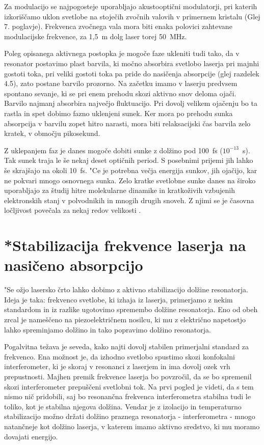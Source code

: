 Za modulacijo se najpogosteje uporabljajo akustooptični modulatorji, pri
katerih izkoriščamo uklon svetlobe na stoječih zvočnih valovih v
primernem kristalu (Glej 7. poglavje). Frekvenca zvočnega vala mora biti
enaka polovici zahtevane modulacijske frekvence, za 1,5~m dolg laser torej
50~MHz.

Poleg opisanega aktivnega postopka je mogoče faze ukleniti tudi tako, da v
resonator postavimo plast barvila, ki močno absorbira svetlobo laserja pri
majnhi gostoti toka, pri veliki gostoti toka pa pride do nasičenja
absorpcije (glej razdelek 4.5), zato postane barvilo prozorno. Na začetku
imamo v laserju predvsem spontano sevanje, ki se pri enem prehodu skozi
aktivno snov deloma ojači. Barvilo najmanj absorbira največjo fluktuacijo.
Pri dovolj velikem ojačenju bo ta rastla in spet dobimo fazno uklenjeni
sunek. Ker mora po prehodu sunka absorpcija v barvilu zopet hitro narasti,
mora biti relaksacijski čas barvila zelo kratek, v območju pikosekund.

Z uklepanjem faz je danes mogoče dobiti sunke z dolžino pod 100~fs ($%
10^{-13}$~s). Tak sunek traja le še nekaj deset optičnih period. S
posebnimi prijemi jih lahko še skrajšajo na okoli 10~fs. "Ce je potrebna
večja energija sunkov, jih ojačijo, kar ne pokvari mnogo osnovnega sunka.
Zelo kratke svetlobne sunke danes na široko uporabljajo za študij hitre
molekularne dinamike in kratkoživih vzbujenih elektronskih stanj v
polvodnikih in mnogih drugih snoveh. Z njimi se je časovna ločljivost
povečala za nekaj redov velikosti \cite{pikosekunde}.

\section{*Stabilizacija frekvence laserja na na\-sičeno absorpcijo}
\label{chap:stabilizacija}

"Se ožjo lasersko črto lahko dobimo z aktivno stabilizacijo dolžine
resonatorja. Ideja je taka: frekvenco svetlobe, ki izhaja iz laserja,
primerjamo z nekim standardom in iz razlike ugotovimo spremembo dolžine
resonatorja. Eno od obeh zrcal je nameščeno na piezoelektričnem nosilcu,
ki mu z električno napetostjo lahko spreminjamo dolžino in tako popravimo
dolžino resonatorja.

Pogalvitna težava je seveda, kako najti dovolj stabilen primerjalni
standard za frekvenco. Ena možnost je, da izhodno svetlobo spustimo skozi
konfokalni interferometer, ki je skoraj v resonanci z laserjem in ima dovolj
ozek vrh prepustnosti. Majhen premik frekvence laserja bo povzročil, da se
bo spremenil skozi interferometer prepuščeni svetlobni tok. Na prvi pogled
je videti, da s tem nismo nič pridobili, saj bo resonančna frekvenca
interferometra stabilna tudi le toliko, kot je stabilna njegova dolžina.
Vendar je z izolacijo in temperaturno stabilizacijo možno držati dolžino
praznega resonatorja - interferometra - mnogo natančneje kot dolžino
laserja, v katerem imamo aktivno sredstvo, ki mu moramo dovajati energijo.

